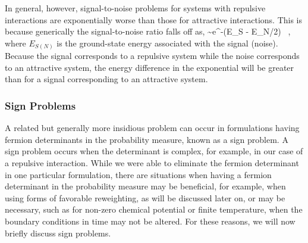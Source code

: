 In general, however, signal-to-noise problems for systems with repulsive interactions are exponentially worse than those for attractive interactions. This is because generically the signal-to-noise ratio falls off as,
\beq
\calR \sim e^{-\left(E_S - E_N/2\right)\tau} \ ,
\eeq
where $E_{S(N)}$ is the ground-state energy associated with the signal (noise). Because the signal corresponds to a repulsive system while the noise corresponds to an attractive system, the energy difference in the exponential will be greater than for a signal corresponding to an attractive system. 

\subsubsection{\label{sec:sign}Sign Problems}
A related but generally more insidious problem can occur in formulations having fermion determinants in the probability measure, known as a sign problem. A sign problem occurs when the determinant is complex, for example, in our case of a repulsive interaction. While we were able to eliminate the fermion determinant in one particular formulation, there are situations when having a fermion determinant in the probability measure may be beneficial, for example, when using forms of favorable reweighting, as will be discussed later on, or may be necessary, such as for non-zero chemical potential or finite temperature, when the boundary conditions in time may not be altered. For these reasons, we will now briefly discuss sign problems. 

